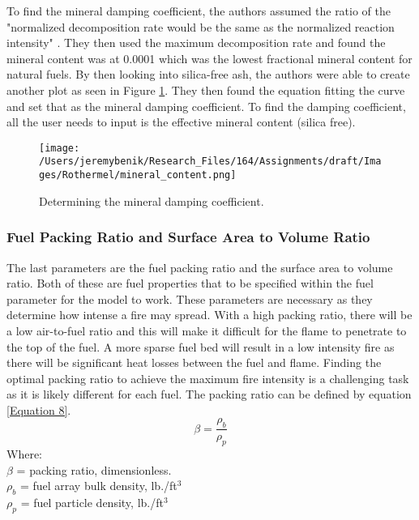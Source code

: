 \documentclass{article}
\begin{document}
 \indent To find the mineral damping coefficient, the authors assumed the ratio of the "normalized decomposition rate would be the same as the normalized reaction intensity" \citep{Rothermel1972}. They then used the maximum decomposition rate and found the mineral content was at 0.0001 which was the lowest fractional mineral content for natural fuels. By then looking into silica-free ash, the authors were able to create another plot as seen in Figure \ref{rothermel_mineral_damping_coef}. They then found the equation fitting the curve and set that as the mineral damping coefficient. To find the damping coefficient, all the user needs to input is the effective mineral content (silica free). \\
 \begin{figure}[h]
 \centering
  \texttt{[image: /Users/jeremybenik/Research\_Files/164/Assignments/draft/Images/Rothermel/mineral\_content.png]}
  \caption{Determining the mineral damping coefficient.}
  \label{rothermel_mineral_damping_coef}
\end{figure}
 \subsubsection{Fuel Packing Ratio and Surface Area to Volume Ratio}
 \indent The last parameters are the fuel packing ratio and the surface area to volume ratio. Both of these are fuel properties that to be specified within the fuel parameter for the model to work. These parameters are necessary as they determine how intense a fire may spread. With a high packing ratio, there will be a low air-to-fuel ratio and this will make it difficult for the flame to penetrate to the top of the fuel. A more sparse fuel bed will result in a low intensity fire as there will be significant heat losses between the fuel and flame. Finding the optimal packing ratio to achieve the maximum fire intensity is a challenging task as it is likely different for each fuel. The packing ratio can be defined by equation \ref{Equation 8}.
 \begin{equation}
 	\beta = \frac {\rho _ b } {\rho _ p} 
 	\label{Equation 8}
 \end{equation}
Where: \\
$\beta$ = packing ratio, dimensionless. \\
$\rho _ b$ = fuel array bulk density, lb./ft$^3$ \\
$\rho _ p$ = fuel particle density, lb./ft$^3$ \\
\end{document}
